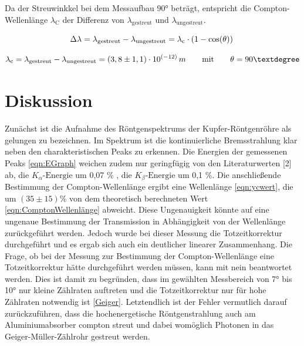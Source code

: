 \documentclass[titlepage = firstcover]{scrartcl}
\begin{document}
        \noindent
        Da der Streuwinkkel bei dem Messaufbau 90° beträgt, entspricht die Compton-Wellenlänge $\lambda_{\text{C}}$ der Differenz von $\lambda_{\text{gestreut}}$
        und $\lambda_{\text{ungestreut}}$.
        
        \begin{equation*}
            \Delta \lambda = \lambda_{\text{gestreut}} - \lambda_{\text{ungestreut}} = \lambda_{\text{c}} \cdot \left(1 -\cos (\theta)\right) \\
            \label{eqn:ycexp}
        \end{equation*}

        \begin{equation}
            \lambda_{\text{c}} = \lambda_{\text{gestreut}} - \lambda_{\text{ungestreut}} = (3,8 \pm 1,1) \cdot 10^{\left(-12\right)} \, m \qquad \text{mit} \qquad \theta=90° \\
            \label{eqn:ycwert}
        \end{equation} 



    \section{Diskussion}
        Zunächst ist die Aufnahme des Röntgenspektrums der Kupfer-Röntgenröhre als gelungen zu bezeichnen. Im Spektrum ist die kontinuierliche Bremsstrahlung 
        klar neben den charakteristischen Peaks zu erkennen. Die Energien der gemessenen Peaks \ref{eqn:EGraph} weichen zudem nur geringfügig von den Literaturwerten [2] ab, 
        die $K_{\alpha}\text{-Energie}$ um 0,07 \% , die $K_{\beta}\text{-Energie}$ um 0,1 \%. Die anschließende Bestimmung der Compton-Wellenlänge ergibt
        eine Wellenlänge \ref{eqn:ycwert}, die um $(35 \pm 15)$\% von dem theoretisch berechneten Wert \ref{eqn:ComptonWellenlänge} abweicht. Diese Ungenauigkeit könnte auf eine
        ungenaue Bestimmung der Transmission in Abhängigkeit von der Wellenlänge zurückgeführt werden. Jedoch wurde bei dieser Messung die Totzeitkorrektur
        durchgeführt und es ergab sich auch ein deutlicher linearer Zusammenhang. Die Frage, ob bei der Messung zur Bestimmung der Compton-Wellenlänge eine
        Totzeitkorrektur hätte durchgeführt werden müssen, kann mit nein beantwortet werden. Dies ist damit zu begründen, dass im gewählten Messbereich von 
        7° bis 10° nur kleine Zählraten auftreten und die Totzeitkorrektur nur für hohe Zählraten notwendig ist \ref{Geiger}. Letztendlich ist der Fehler 
        vermutlich darauf zurückzuführen, dass die hochenergetische Röntgenstrahlung auch am Aluminiumabsorber compton streut und dabei womöglich Photonen
        in das Geiger-Müller-Zählrohr gestreut werden.
\end{document}
